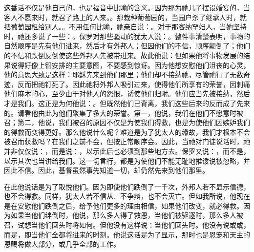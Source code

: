 这番话不仅是他自己的，也是福音中比喻的含义。因为那为祂儿子摆设婚宴的，当客人不愿来时，就召了路上的人来。。那栽种葡萄园的，当园户杀了继承人时，就把葡萄园租给别人。。不用任何比喻，祂亲自说：。对于那客纳罕妇人，当她坚持时，祂还多说了一些：。保罗对那些骚动的犹太人说：。整件事清楚表明，事物的自然顺序是先有他们进来，然后才有外邦人；但因他们的不信，顺序颠倒了；他们的不信和跌倒反倒使这些外邦人先被带进来。故此他说：但如果他将事物发展的结果说得好像上智安排的主要意图，不要感到惊讶。因为他想安慰他们沮丧的心灵，他的意思大致是这样：耶稣先来到他们那里；他们却不接纳祂，尽管祂行了无数奇迹，反而把祂钉死了。因此祂将外邦人吸引过来，使得他们所享有的荣誉，因刺痛他们麻木的心，至少由于对他人的怨恨，诱使他们归附。他们应当先被接纳，然后才是我们。这正是为何他说：。但既然他们已背离，我们这些后来的反而成了先来的。请看他由此为他们聚集了多大的荣誉。第一，他说，我们在他们不愿意时被召；第二，他说，我们被召的原因不仅是为使我们得救，也是为使他们因嫉妒我们的得救而变得更好。那么他说什么呢？难道是为了犹太人的缘故，我们才根本不会被召而获救吗？在我们之前不会，但按正常顺序会。因此，当祂对门徒说话时，祂并非仅仅说：，而是说：，以示此后也必须到那些地方去。保罗又说：，而不是，以示其次也当讲给我们。这一切言行，都是为使他们不能无耻地推诿说被忽略，并因此不信。因此，基督虽然事先知道一切，却仍然先来到他们那里。\par

\par

在此他说话是为了取悦他们。因为即使他们跌倒了一千次，外邦人若不显示信德，也不会得救。同样，犹太人若不信从、不争辩，也不会灭亡。但如我所说，他现在是在安慰他们跌倒之后，给予他们更多的理由相信，如果他们改变，就必得救。因为如果当他们绊倒时，他说，那么多人得了救恩，当他们被驱逐时，那么多人被召，试想当他们回头时将如何。但他没有这样说：当他们回头时。他没有说或或，而是，即当他们全都将进来的时刻。他说这话是为了显示，那时也是恩宠和天主的恩赐将做大部分，或几乎全部的工作。\par


